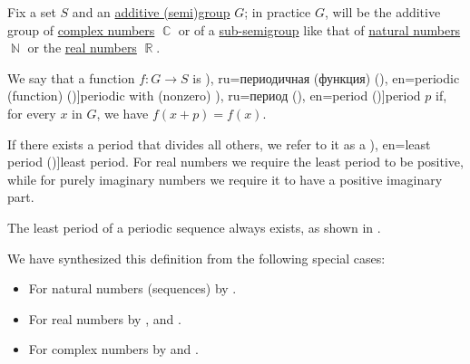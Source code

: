 \begin{definition}\label{def:periodic_function}
  Fix a set \( S \) and an \hyperref[con:additive_semigroup]{additive (semi)group} \( G \); in practice \( G \), will be the additive group of \hyperref[def:complex_numbers]{complex numbers} \( \BbbC \) or of a \hyperref[def:semigroup/submodel]{sub-semigroup} like that of \hyperref[def:natural_numbers]{natural numbers} \( \BbbN \) or the \hyperref[def:real_numbers]{real numbers} \( \BbbR \).

  We say that a function \( f: G \to S \) is \term[bg=периодична (функция) (\cite[318]{ИлинСадовничиСендов1989АнализТом2}), ru=периодичная (функция) (\cite[371]{Фихтенгольц1968ОсновыТом2}), en=periodic (function) (\cite[def. 5.1.1]{Tao2022AnalysisII})]{periodic} with (nonzero) \term[bg=период (\cite[318]{ИлинСадовничиСендов1989АнализТом2}), ru=период (\cite[371]{Фихтенгольц1968ОсновыТом2}), en=period (\cite[def. 5.1.1]{Tao2022AnalysisII})]{period} \( p \) if, for every \( x \) in \( G \), we have \( f(x + p) = f(x) \).

  If there exists a period that divides all others, we refer to it as a \term[ru=основной период (\cite[102]{Маркушевич1967АналитическиеФункцииТом1}), en=least period (\cite[def. 8.3]{LidlNiederreiter1997FiniteFields})]{least period}. For real numbers we require the least period to be positive, while for purely imaginary numbers we require it to have a positive imaginary part.
\end{definition}
\begin{comments}
  \item The least period of a periodic sequence always exists, as shown in .
  \item We have synthesized this definition from the following special cases:
  \begin{itemize}
    \item For natural numbers (sequences) by .
    \item For real numbers by ,  and .
    \item For complex numbers by  and .
  \end{itemize}
\end{comments}

